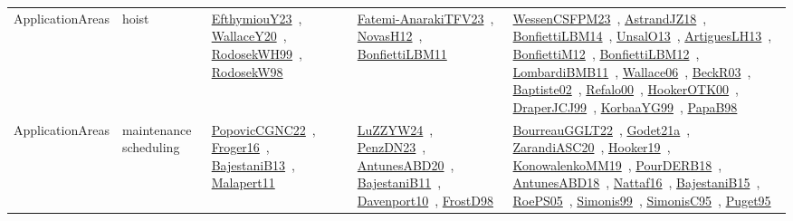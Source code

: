 {\begin{longtable}{lp{3cm}>{\raggedright\arraybackslash}p{6cm}>{\raggedright\arraybackslash}p{6cm}>{\raggedright\arraybackslash}p{8cm}}
\index{hoist}\index{ApplicationAreas!hoist}ApplicationAreas & hoist & \href{../works/EfthymiouY23.pdf}{EfthymiouY23}~\cite{EfthymiouY23}, \href{../works/WallaceY20.pdf}{WallaceY20}~\cite{WallaceY20}, \href{../works/RodosekWH99.pdf}{RodosekWH99}~\cite{RodosekWH99}, \href{../works/RodosekW98.pdf}{RodosekW98}~\cite{RodosekW98} & \href{../works/Fatemi-AnarakiTFV23.pdf}{Fatemi-AnarakiTFV23}~\cite{Fatemi-AnarakiTFV23}, \href{../works/NovasH12.pdf}{NovasH12}~\cite{NovasH12}, \href{../works/BonfiettiLBM11.pdf}{BonfiettiLBM11}~\cite{BonfiettiLBM11} & \href{../works/WessenCSFPM23.pdf}{WessenCSFPM23}~\cite{WessenCSFPM23}, \href{../works/AstrandJZ18.pdf}{AstrandJZ18}~\cite{AstrandJZ18}, \href{../works/BonfiettiLBM14.pdf}{BonfiettiLBM14}~\cite{BonfiettiLBM14}, \href{../works/UnsalO13.pdf}{UnsalO13}~\cite{UnsalO13}, \href{../works/ArtiguesLH13.pdf}{ArtiguesLH13}~\cite{ArtiguesLH13}, \href{../works/BonfiettiM12.pdf}{BonfiettiM12}~\cite{BonfiettiM12}, \href{../works/BonfiettiLBM12.pdf}{BonfiettiLBM12}~\cite{BonfiettiLBM12}, \href{../works/LombardiBMB11.pdf}{LombardiBMB11}~\cite{LombardiBMB11}, \href{../works/Wallace06.pdf}{Wallace06}~\cite{Wallace06}, \href{../works/BeckR03.pdf}{BeckR03}~\cite{BeckR03}, \href{../works/Baptiste02.pdf}{Baptiste02}~\cite{Baptiste02}, \href{../works/Refalo00.pdf}{Refalo00}~\cite{Refalo00}, \href{../works/HookerOTK00.pdf}{HookerOTK00}~\cite{HookerOTK00}, \href{../works/DraperJCJ99.pdf}{DraperJCJ99}~\cite{DraperJCJ99}, \href{../works/KorbaaYG99.pdf}{KorbaaYG99}~\cite{KorbaaYG99}, \href{../works/PapaB98.pdf}{PapaB98}~\cite{PapaB98}\\
\index{maintenance scheduling}\index{ApplicationAreas!maintenance scheduling}ApplicationAreas & maintenance scheduling & \href{../works/PopovicCGNC22.pdf}{PopovicCGNC22}~\cite{PopovicCGNC22}, \href{../works/Froger16.pdf}{Froger16}~\cite{Froger16}, \href{../works/BajestaniB13.pdf}{BajestaniB13}~\cite{BajestaniB13}, \href{../works/Malapert11.pdf}{Malapert11}~\cite{Malapert11} & \href{../works/LuZZYW24.pdf}{LuZZYW24}~\cite{LuZZYW24}, \href{../works/PenzDN23.pdf}{PenzDN23}~\cite{PenzDN23}, \href{../works/AntunesABD20.pdf}{AntunesABD20}~\cite{AntunesABD20}, \href{../works/BajestaniB11.pdf}{BajestaniB11}~\cite{BajestaniB11}, \href{../works/Davenport10.pdf}{Davenport10}~\cite{Davenport10}, \href{../works/FrostD98.pdf}{FrostD98}~\cite{FrostD98} & \href{../works/BourreauGGLT22.pdf}{BourreauGGLT22}~\cite{BourreauGGLT22}, \href{../works/Godet21a.pdf}{Godet21a}~\cite{Godet21a}, \href{../works/ZarandiASC20.pdf}{ZarandiASC20}~\cite{ZarandiASC20}, \href{../works/Hooker19.pdf}{Hooker19}~\cite{Hooker19}, \href{../works/KonowalenkoMM19.pdf}{KonowalenkoMM19}~\cite{KonowalenkoMM19}, \href{../works/PourDERB18.pdf}{PourDERB18}~\cite{PourDERB18}, \href{../works/AntunesABD18.pdf}{AntunesABD18}~\cite{AntunesABD18}, \href{../works/Nattaf16.pdf}{Nattaf16}~\cite{Nattaf16}, \href{../works/BajestaniB15.pdf}{BajestaniB15}~\cite{BajestaniB15}, \href{../works/RoePS05.pdf}{RoePS05}~\cite{RoePS05}, \href{../works/Simonis99.pdf}{Simonis99}~\cite{Simonis99}, \href{../works/SimonisC95.pdf}{SimonisC95}~\cite{SimonisC95}, \href{../works/Puget95.pdf}{Puget95}~\cite{Puget95}\\

\end{longtable}}
